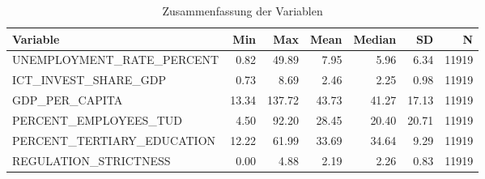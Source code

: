 \begin{table}[!h]
\centering
\caption{Zusammenfassung der Variablen}
\centering
\begin{tabular}[t]{lrrrrrr}
\toprule
Variable & Min & Max & Mean & Median & SD & N\\
\midrule
UNEMPLOYMENT\_RATE\_PERCENT & 0.82 & 49.89 & 7.95 & 5.96 & 6.34 & 11919\\
ICT\_INVEST\_SHARE\_GDP & 0.73 & 8.69 & 2.46 & 2.25 & 0.98 & 11919\\
GDP\_PER\_CAPITA & 13.34 & 137.72 & 43.73 & 41.27 & 17.13 & 11919\\
PERCENT\_EMPLOYEES\_TUD & 4.50 & 92.20 & 28.45 & 20.40 & 20.71 & 11919\\
PERCENT\_TERTIARY\_EDUCATION & 12.22 & 61.99 & 33.69 & 34.64 & 9.29 & 11919\\
\addlinespace
REGULATION\_STRICTNESS & 0.00 & 4.88 & 2.19 & 2.26 & 0.83 & 11919\\
\bottomrule
\end{tabular}
\end{table}
